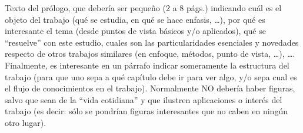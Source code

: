 
Texto del prólogo, que debería ser pequeño (2 a 8 págs.) indicando cuál es el objeto del trabajo (qué se estudia, en qué se hace enfasis, \dots), por qué es interesante el tema (desde puntos de vista básicos y/o aplicados), qué se ``resuelve'' con este estudio, cuales son las particularidades esenciales y novedades respecto de otros trabajos similares (en enfoque, métodos, punto de vista, \dots), \dots. Finalmente, es interesante en un párrafo indicar someramente la estructura del trabajo (para que uno sepa a qué capítulo debe ir para ver algo, y/o sepa cual es el flujo de conocimientos en el trabajo). Normalmente NO debería haber figuras, salvo que sean de la ``vida cotidiana'' y que ilustren aplicaciones o interés del trabajo (es decir: sólo se pondrían figuras interesantes que no caben en ningún otro lugar).

